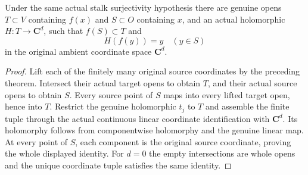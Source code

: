 \begin{theorem}
\label{hir:actual-holomorphic-stalk-surjection-local-left-inverse}
\leanok
Under the same actual stalk surjectivity hypothesis there are genuine opens
$T\subset V$ containing $f(x)$ and $S\subset O$ containing $x$, and an actual
holomorphic $H:T\to\mathbf C^d$, such that $f(S)\subset T$ and
\[
 H(f(y))=y\quad (y\in S)
\]
in the original ambient coordinate space $\mathbf C^d$.
\end{theorem}
\begin{proof}
Lift each of the finitely many original source coordinates by the preceding
theorem. Intersect their actual target opens to obtain $T$, and their actual
source opens to obtain $S$. Every source point of $S$ maps into every lifted
target open, hence into $T$. Restrict the genuine holomorphic $t_j$ to $T$
and assemble the finite tuple through the actual continuous linear coordinate
identification with $\mathbf C^d$. Its holomorphy follows from componentwise
holomorphy and the genuine linear map. At every point of $S$, each component
is the original source coordinate, proving the whole displayed identity.
For $d=0$ the empty intersections are whole opens and the unique coordinate
tuple satisfies the same identity.
\end{proof}


